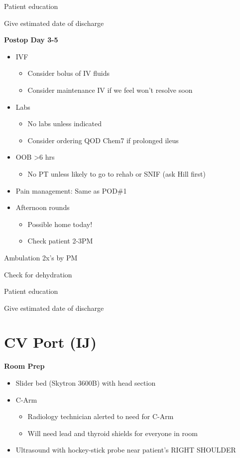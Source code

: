 \documentclass[
  letterpaper,
]{scrbook}
\providecommand{\tightlist}{%
  \setlength{\itemsep}{0pt}\setlength{\parskip}{0pt}}
\begin{document}
Patient education

Give estimated date of discharge

\textbf{Postop Day 3-5}

\begin{itemize}
\tightlist
\item
  IVF

  \begin{itemize}
  \tightlist
  \item
    Consider bolus of IV fluids
  \item
    Consider maintenance IV if we feel won't resolve soon
  \end{itemize}
\item
  Labs

  \begin{itemize}
  \tightlist
  \item
    No labs unless indicated
  \item
    Consider ordering QOD Chem7 if prolonged ileus
  \end{itemize}
\item
  OOB \textgreater6 hrs

  \begin{itemize}
  \tightlist
  \item
    No PT unless likely to go to rehab or SNIF (ask Hill first)
  \end{itemize}
\item
  Pain management: Same as POD\#1
\item
  Afternoon rounds

  \begin{itemize}
  \tightlist
  \item
    Possible home today!
  \item
    Check patient 2-3PM
  \end{itemize}
\end{itemize}

Ambulation 2x's by PM

Check for dehydration

Patient education

Give estimated date of discharge

\chapter{CV Port (IJ)}\label{cv_port_salo}

\textbf{Room Prep}

\begin{itemize}
\tightlist
\item
  Slider bed (Skytron 3600B) with head section
\item
  C-Arm

  \begin{itemize}
  \tightlist
  \item
    Radiology technician alerted to need for C-Arm
  \item
    Will need lead and thyroid shields for everyone in room
  \end{itemize}
\item
  Ultrasound with hockey-stick probe near patient's RIGHT SHOULDER
\end{itemize}
\end{document}
